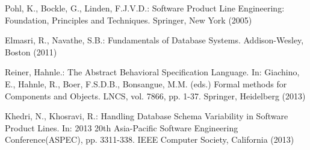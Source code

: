 \documentclass[conference]{IEEEtran}
\begin{document}
\begin{thebibliography}{4}

	 Pohl, K., Bockle, G., Linden, F.J.V.D.: Software Product Line Engineering: Foundation, Principles and Techniques. Springer, New York (2005)

	 Elmasri, R., Navathe, S.B.: Fundamentals of Database Systems. Addison-Wesley, Boston (2011)

	 Reiner, Hahnle.: The Abstract Behavioral Specification Language. In: Giachino, E., Hahnle, R., Boer, F.S.D.B., Bonsangue, M.M. (eds.) Formal methods for Components and Objects. LNCS, vol. 7866, pp. 1-37. Springer, Heidelberg (2013)

	 Khedri, N., Khosravi, R.: Handling Database Schema Variability in Software Product Lines. In: 2013 20th Asia-Pacific Software Engineering Conference(ASPEC), pp.
	3311-338. IEEE Computer Society, California (2013)

\end{thebibliography}
\end{document}
